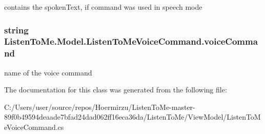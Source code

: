 contains the spoken\+Text, if command was used in speech mode 

\subsubsection[{\texorpdfstring{voice\+Command}{voiceCommand}}]{\setlength{\rightskip}{0pt plus 5cm}string Listen\+To\+Me.\+Model.\+Listen\+To\+Me\+Voice\+Command.\+voice\+Command}\hypertarget{class_listen_to_me_1_1_model_1_1_listen_to_me_voice_command_ac1ab4ff605dddd6dfe7f038e46cf522e}{}\label{class_listen_to_me_1_1_model_1_1_listen_to_me_voice_command_ac1ab4ff605dddd6dfe7f038e46cf522e}


name of the voice command 



The documentation for this class was generated from the following file\+:\begin{DoxyCompactItemize}
\item 
C\+:/\+Users/user/source/repos/\+Hoermirzu/\+Listen\+To\+Me-\/master-\/89f0b49594deaade7bfad24dad062ff16eca36da/\+Listen\+To\+Me/\+View\+Model/Listen\+To\+Me\+Voice\+Command.\+cs\end{DoxyCompactItemize}
